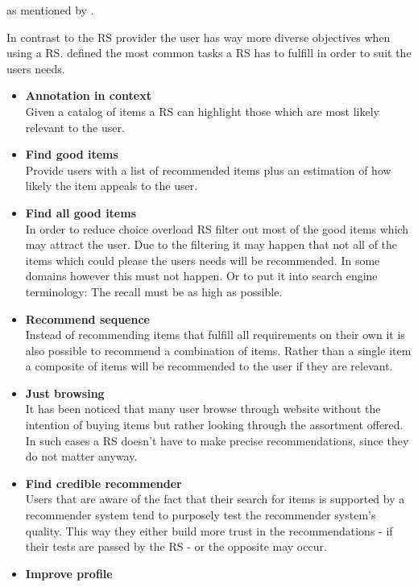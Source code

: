 as mentioned by \citeauthor{ricci:2011}.\citep[p.~4-5]{ricci:2011}


In contrast to the RS provider the user has way more diverse objectives when using a RS.
\citeauthor{herlocker:2004} defined the most common tasks a RS has to fulfill in order to suit the users needs.
\begin{itemize}
    \item\textbf{Annotation in context}\hfill\\
        Given a catalog of items a RS can highlight those which are most likely relevant to the user.
    \item\textbf{Find good items}\hfill\\
        Provide users with a list of recommended items plus an estimation of how likely the item appeals to the user.
    \item\textbf{Find all good items}\hfill\\
        In order to reduce choice overload RS filter out most of the good items which may attract the user.
        Due to the filtering it may happen that not all of the items which could please the users needs will be recommended.
        In some domains however this must not happen.
        Or to put it into search engine terminology: The recall must be as high as possible.
    \item\textbf{Recommend sequence}\hfill\\
        Instead of recommending items that fulfill all requirements on their own it is also possible to recommend a combination of items.
        Rather than a single item a composite of items will be recommended to the user if they are relevant.
    \item\textbf{Just browsing}\hfill\\
        It has been noticed that many user browse through website without the intention of buying items but rather looking through the assortment offered.
        In such cases a RS doesn't have to make precise recommendations, since they do not matter anyway.
    \item\textbf{Find credible recommender}\hfill\\
        Users that are aware of the fact that their search for items is supported by a recommender system tend to purposely test the recommender system's quality.
        This way they either build more trust in the recommendations - if their tests are passed by the RS - or the opposite may occur.
    \item\textbf{Improve profile}\hfill\\

\end{itemize}
